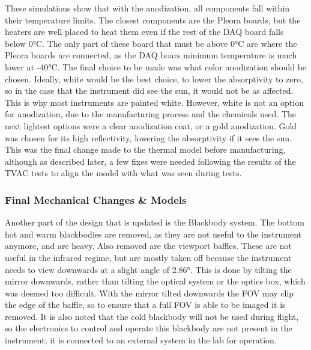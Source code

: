 These simulations show that with the anodization, all components fall within their temperature limits. The closest components are the Pleora boards, but the heaters are well placed to heat them even if the rest of the DAQ board falls below 0°C. The only part of these board that must be above 0°C are where the Pleora boards are connected, as the DAQ boars minimum temperature is much lower at -40°C. The final choice to be made was what color anodization should be chosen. Ideally, white would be the best choice, to lower the absorptivity to zero, so in the case that the instrument did see the sun, it would not be as affected. This is why most instruments are painted white. However, white is not an option for anodization, due to the manufacturing process and the chemicals used. The next lightest options were a clear anodization coat, or a gold anodization. Gold was chosen for its high reflectivity, lowering the absorptivity if it sees the sun. This was the final change made to the thermal model before manufacturing, although as described later, a few fixes were needed following the results of the TVAC tests to align the model with what was seen during tests.

\subsubsection{Final Mechanical Changes \& Models}
Another part of the design that is updated is the Blackbody system. The bottom hot and warm blackbodies are removed, as they are not useful to the instrument anymore, and are heavy. Also removed are the viewport baffles. These are not useful in the infrared regime, but are mostly taken off because the instrument needs to view downwards at a slight angle of 2.86°. This is done by tilting the mirror downwards, rather than tilting the optical system or the optics box, which was deemed too difficult. With the mirror tilted downwards the FOV may clip the edge of the baffle, so to ensure that a full FOV is able to be imaged it is removed. It is also noted that the cold blackbody will not be used during flight, so the electronics to control and operate this blackbody are not present in the instrument; it is connected to an external system in the lab for operation.

